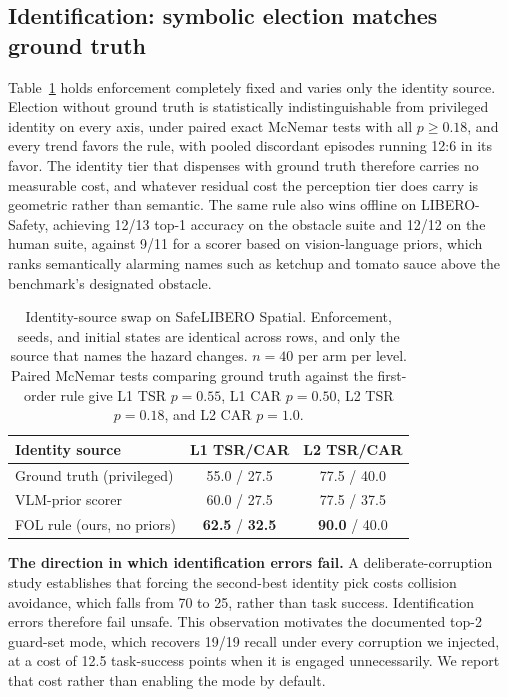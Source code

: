 \documentclass[conference]{IEEEtran}
\begin{document}
\subsection{Identification: symbolic election matches ground truth}
\label{sec:e3}

Table~\ref{tab:e3} holds enforcement completely fixed and varies only the identity source. Election without ground truth is statistically indistinguishable from privileged identity on every axis, under paired exact McNemar tests with all $p\ge0.18$, and every trend favors the rule, with pooled discordant episodes running 12:6 in its favor. The identity tier that dispenses with ground truth therefore carries no measurable cost, and whatever residual cost the perception tier does carry is geometric rather than semantic. The same rule also wins offline on LIBERO-Safety, achieving 12/13 top-1 accuracy on the obstacle suite and 12/12 on the human suite, against 9/11 for a scorer based on vision-language priors, which ranks semantically alarming names such as ketchup and tomato sauce above the benchmark's designated obstacle.

\begin{table}[t]
\centering
\caption{Identity-source swap on SafeLIBERO Spatial. Enforcement, seeds, and initial states are identical across rows, and only the source that names the hazard changes. $n{=}40$ per arm per level. Paired McNemar tests comparing ground truth against the first-order rule give L1 TSR $p=0.55$, L1 CAR $p=0.50$, L2 TSR $p=0.18$, and L2 CAR $p=1.0$.}
\label{tab:e3}
\begin{tabular}{lcc}
\toprule
Identity source & L1 TSR/CAR & L2 TSR/CAR \\
\midrule
Ground truth (privileged) & 55.0 / 27.5 & 77.5 / 40.0 \\
VLM-prior scorer          & 60.0 / 27.5 & 77.5 / 37.5 \\
FOL rule (ours, no priors)& \textbf{62.5} / \textbf{32.5} & \textbf{90.0} / 40.0 \\
\bottomrule
\end{tabular}
\end{table}

\textbf{The direction in which identification errors fail.} A deliberate-corruption study establishes that forcing the second-best identity pick costs collision avoidance, which falls from 70 to 25, rather than task success. Identification errors therefore fail unsafe. This observation motivates the documented top-2 guard-set mode, which recovers 19/19 recall under every corruption we injected, at a cost of 12.5 task-success points when it is engaged unnecessarily. We report that cost rather than enabling the mode by default.
\end{document}
